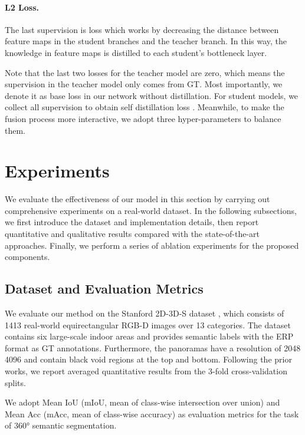 \documentclass[runningheads]{llncs}
\begin{document}
	
	
	\paragraph{L2 Loss.} The last supervision is  loss which works by decreasing the distance between feature maps in the student branches and the teacher branch. 
	In this way, the knowledge in feature maps is distilled to each student's bottleneck layer.
	
	
	
	Note that the last two losses for the teacher model are zero, which means the supervision in the teacher model only comes from GT. 
	Most importantly, we denote it as base loss   in our network without distillation.
	For student models, we collect all supervision to obtain self distillation loss .
	Meanwhile, to make the fusion process more interactive, we adopt three hyper-parameters to balance them.
	
	
	
	
	\section{Experiments}
	
	
	
	We evaluate the effectiveness of our model in this section by carrying out comprehensive experiments on a real-world dataset.
	In the following subsections, we first introduce the dataset and implementation details, then report quantitative and qualitative results compared with the state-of-the-art approaches.
	Finally, we perform a series of ablation experiments for the proposed components.
	
	
	\subsection{Dataset and Evaluation Metrics}
	
	
	We evaluate our method on the Stanford 2D-3D-S dataset \cite{armeni2017joint}, which consists of 1413 real-world equirectangular RGB-D images over 13 categories. 
	The dataset contains six large-scale indoor areas and provides semantic labels with the ERP format as GT annotations.
	Furthermore, the panoramas have a resolution of 2048  4096 and contain black void regions at the top and bottom.
	Following the prior works, we report averaged quantitative results from the 3-fold cross-validation splits.
	
	We adopt Mean IoU (mIoU, mean of class-wise intersection over union) and Mean Acc (mAcc, mean of class-wise accuracy) as evaluation metrics for the task of 360° semantic segmentation.
	
\end{document}
